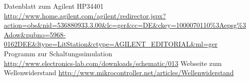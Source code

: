 
\begin{thebibliography}{9}
		Datenblatt zum Agilent HP34401\\
		\url{http://www.home.agilent.com/agilent/redirector.jspx?action=obs&nid=536880933.3.00&lc=ger&cc=DE&ckey=1000070110%3Aepsg%3Adow&pubno=5968-0162DEE&ltype=LitStation&ctype=AGILENT_EDITORIAL&ml=ger}
		Programm zur Schaltungssimulation\\
		\url{http://www.electronics-lab.com/downloads/schematic/013}
		Webseite zum Wellenwiderstand
		\url{http://www.mikrocontroller.net/articles/Wellenwiderstand}



\end{thebibliography}


